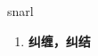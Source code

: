 
\begin{frame}
{\huge snarl}
\begin{center}
\begin{enumerate}\Large
  \item \textbf{纠缠，纠结}
\end{enumerate}
\end{center}
\end{frame}

